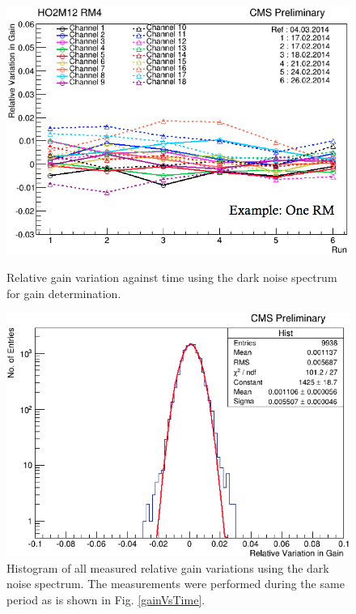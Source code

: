 \begin{figure}[h]
\centering
\begin{minipage}[t]{0.475\textwidth}
\includegraphics[width=\textwidth]{Figures/kuensken/gainOverTime.png}
\caption{Relative gain variation against time using the dark noise spectrum for gain determination.}
\label{gainVsTime}
\end{minipage}
\hspace{0.5cm}
\begin{minipage}[t]{0.475\textwidth}
\includegraphics[width=\textwidth]{Figures/kuensken/gainTotal.png}
\caption{Histogram of all measured relative gain variations using the dark noise spectrum. The measurements were performed during the same period as is shown in Fig. \ref{gainVsTime}.}
\label{gainHist}
\end{minipage}
\end{figure}
